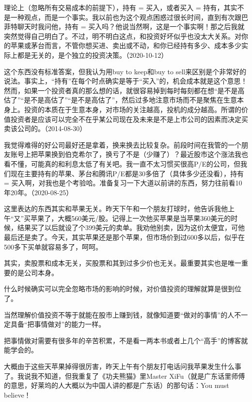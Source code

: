 理论上（忽略所有交易成本的前提下），持有 = 买入，或者买入 = 持有，其实不是一种观点，而是一个事实。我以前也为这个观点困惑过很长时间，直到有次跟巴菲特聊天时我问他，持有 = 买入吗？他说当然啊，这是一个事实啊！那之后我就突然觉得自己明白了。不过，明不明白这点，和投资好坏似乎也没太大关系。对你的苹果或茅台而言，不管你想买进、卖出或不动，和你已经持有多少、成本多少实际上都是无关的，是个独立的投资决策。（2020-10-12）


这个东西没有标准答案，但我认为用buy to keep和buy to sell来区别是个非常好的说法。事实上，“持有”在每个时点确实是等于“买入”的，机会成本就是这个意思！然而，如果一个投资者真的那么想的话，就很容易掉到每时每刻都在想“是不是高估了”“是不是高估了”“是不是高估了”，然后过多地注意市场而不是聚焦在生意本身上。投资的本质在于生意本身，对市场的关注越高，投机的成分越高。所谓的价值投资者是应该可以完全不在乎某公司现在及未来是不是上市公司的因素而决定买卖该公司的。（2014-08-30）


我觉得难得的好公司最好还是拿着，换来换去比较复杂。前段时间在我管的一个朋友账号上把苹果换到伯克希尔了，换亏了不是（少赚了）？最近股市这个涨法我也看不懂，可能真的和利息太低了有关吧。我一直不太习惯买很高P/E的公司，但我们现在主要持有的苹果、茅台和腾讯P/E都是30多倍了（具体多少还没看），持有 = 买入啊，对我也是个考验哈。准备复习一下大道以前讲的东西，努力往前看10年20年。（2020-08-25）

这里表达的东西其实和苹果无关。昨天下午和一个朋友打球时，他告诉我他上午“又”买苹果了，大概560美元/股。记得上一次他买苹果是当苹果360美元的时候，结果买了以后就设了个399美元的卖单。我劝他别卖，因为这价太便宜，可他最后还是卖了。今天，其实苹果还是那个苹果，但市场价到过600多以后，似乎在500多下买单就容易多了，呵呵。

其实，卖股票和成本无关，买股票和其到过多少价也无关。最重要其实也是唯一重要的是公司本身。

什么时候确实可以完全忽略市场的影响的时候，对价值投资的理解就算是很到位了。

当然理解价值投资不等于就能在股市上赚到钱，就像知道要“做对的事情”的人不一定具备“把事情做对”的能力一样。

把事情做对需要有很多年的辛苦积累，不是看一两本书或者上几个“高手”的博客就能学会的。

大概由于这些天苹果掉得很厉害，昨天上午有个朋友打电话问我苹果发生什么事了。我说我不知道，但我重复了《功夫熊猫》里Master XiFu（就是广东话里师傅的意思，好莱坞的人大概以为中国人讲的都是广东话）的那句话：You must believe！

